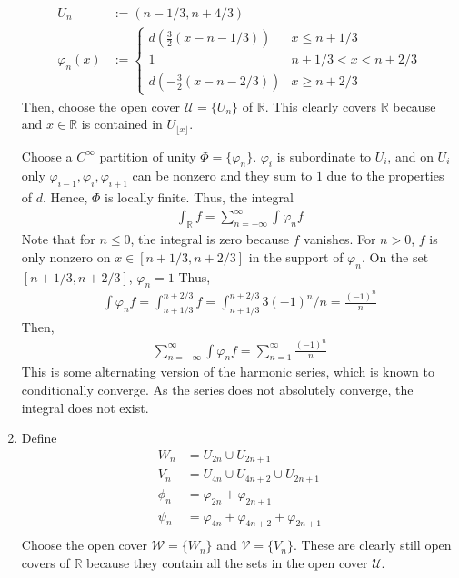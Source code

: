 \documentclass{exam}
\numberwithin{equation}{section}
\newcommand{\R}{\mathbb{R}}
\begin{document}
\begin{enumerate}[label=(\alph*)]
\begin{align*}
            U_n&:=(n-1/3,n+4/3)\\
            \varphi_n(x)&:=\begin{cases}
                d\left(\frac{3}{2}(x-n-1/3)\right) & x\leq n+1/3\\
                1 & n+1/3<x<n+2/3\\
                d\left(-\frac{3}{2}(x-n-2/3)\right) & x\geq n+2/3
            \end{cases}
        \end{align*}
        Then, choose the open cover $\mathcal{U}=\{U_n\}$ of $\R$. This clearly covers $\R$ because and $x\in\R$ is contained in $U_{\lfloor x\rfloor}$.
        
        Choose a $C^\infty$ partition of unity $\Phi=\{\varphi_n\}$. $\varphi_i$ is subordinate to $U_i$, and on $U_i$ only $\varphi_{i-1},\varphi_i,\varphi_{i+1}$ can be nonzero and they sum to $1$ due to the properties of $d$. Hence, $\Phi$ is locally finite. Thus, the integral
        \begin{align*}
            \int_\R f=\sum_{n=-\infty}^\infty\int\varphi_nf
        \end{align*}
        Note that for $n\leq0$, the integral is zero because $f$ vanishes. For $n>0$, $f$ is only nonzero on $x\in[n+1/3,n+2/3]$ in the support of $\varphi_n$. On the set $[n+1/3,n+2/3]$, $\varphi_n=1$ Thus,
        \begin{align*}
            \int\varphi_nf=\int_{n+1/3}^{n+2/3}f=\int_{n+1/3}^{n+2/3}3(-1)^n/n=\frac{(-1)^n}{n}
        \end{align*}
        Then,
        \begin{align*}
            \sum_{n=-\infty}^\infty\int\varphi_nf=\sum_{n=1}^\infty\frac{(-1)^n}{n}
        \end{align*}
        This is some alternating version of the harmonic series, which is known to conditionally converge. As the series does not absolutely converge, the integral does not exist.

        \item Define
        \begin{align*}
            W_n&=U_{2n}\cup U_{2n+1}\\
            V_n&=U_{4n}\cup U_{4n+2}\cup U_{2n+1}\\
            \phi_n&=\varphi_{2n}+\varphi_{2n+1}\\
            \psi_n&=\varphi_{4n}+\varphi_{4n+2}+\varphi_{2n+1}\\
        \end{align*}
        Choose the open cover $\mathcal{W}=\{W_n\}$ and $\mathcal{V}=\{V_n\}$. These are clearly still open covers of $\R$ because they contain all the sets in the open cover $\mathcal{U}$. 
        

\end{enumerate}
\end{document}
